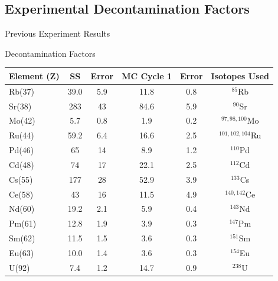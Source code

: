 \documentclass{beamer}
\begin{document}
\subsection{Experimental Decontamination Factors}
\begin{frame}{Previous Experiment Results}
  \vspace{-0.6cm}
  \begin{block}{Decontamination Factors}
    \begin{center}
      \vskip -0.2cm
  {\fontsize{7}{11.2}\selectfont
  \begin{tabular}{l  c  c c c c}\toprule
   Element (Z)  & SS & Error & MC Cycle 1 & Error & Isotopes Used\\ \midrule 
   Rb(37) & 39.0 & 5.9 & 11.8 & 0.8 & $^{85}$Rb \\
   Sr(38) & 283  & 43  & 84.6 & 5.9 & $^{90}$Sr \\
   Mo(42) & 5.7  & 0.8 & 1.9  & 0.2 & $^{97,98,100}$Mo \\
   Ru(44) & 59.2 & 6.4 & 16.6 & 2.5 & $^{101,102,104}$Ru \\
   Pd(46) & 65   & 14  & 8.9  & 1.2 & $^{110}$Pd \\
   Cd(48) & 74   & 17  & 22.1 & 2.5 & $^{112}$Cd \\
   Cs(55) & 177  & 28  & 52.9 & 3.9 & $^{133}$Cs \\
   Ce(58) & 43   & 16  & 11.5 & 4.9 & $^{140,142}$Ce \\
   Nd(60) & 19.2 & 2.1 & 5.9  & 0.4 & $^{143}$Nd \\
   Pm(61) & 12.8 & 1.9 & 3.9  & 0.3 & $^{147}$Pm \\
   Sm(62) & 11.5 & 1.5 & 3.6  & 0.3 & $^{151}$Sm \\
   Eu(63) & 10.0 & 1.4 & 3.6  & 0.3 & $^{154}$Eu \\
   U(92) & 7.4   & 1.2 & 14.7 & 0.9 & $^{238}$U \\ \bottomrule
  \end{tabular}
  }
  \end{center}
  \end{block}
\end{frame}
\end{document}
